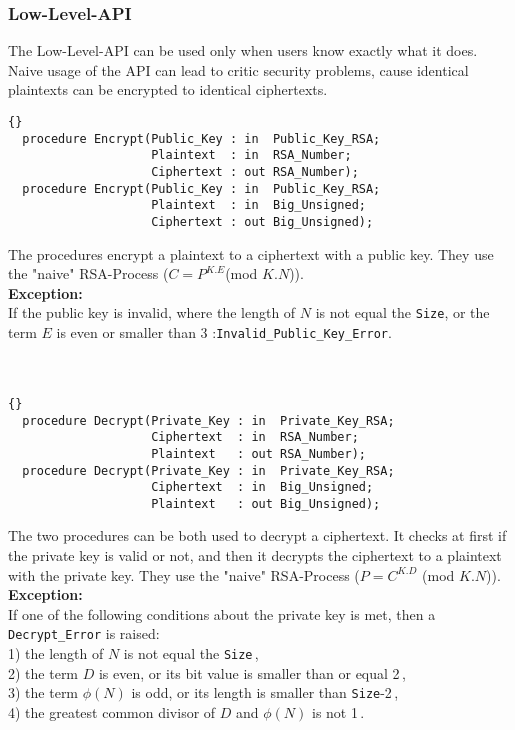 \subsubsection*{Low-Level-API}
The Low-Level-API can be used only when users know exactly what it does. Naive usage of the API can lead to critic security problems, cause identical plaintexts can be encrypted to identical ciphertexts.
\begin{lstlisting}{}
  procedure Encrypt(Public_Key : in  Public_Key_RSA;
                    Plaintext  : in  RSA_Number;
                    Ciphertext : out RSA_Number);   
  procedure Encrypt(Public_Key : in  Public_Key_RSA;
                    Plaintext  : in  Big_Unsigned;
                    Ciphertext : out Big_Unsigned);
\end{lstlisting}
The procedures encrypt a plaintext to a ciphertext with a public key. They use the "naive" RSA-Process ($C=P^{K.E}$(mod $K.N$)).\\
\textbf{Exception:}\\
If the public key is invalid, where the length of $N$ is not equal the \texttt{Size}, or the term $E$ is even or smaller than 3 :\quad \texttt{Invalid\_Public\_Key\_Error}.\\
\hline \\ \ \\
\begin{lstlisting}{}
  procedure Decrypt(Private_Key : in  Private_Key_RSA;
                    Ciphertext  : in  RSA_Number;
                    Plaintext   : out RSA_Number);
  procedure Decrypt(Private_Key : in  Private_Key_RSA;
                    Ciphertext  : in  Big_Unsigned;
                    Plaintext   : out Big_Unsigned);
\end{lstlisting}
The two procedures can be both used to decrypt a ciphertext. It checks at first if the private key is valid or not, and then it decrypts the ciphertext to a plaintext with the private key. They use the "naive" RSA-Process ($P=C^{K.D}$ (mod $K.N$)).\\
\textbf{Exception:}\\ If one of the following conditions about the private key is met, then a \texttt{Decrypt\_Error} is raised:\\
1) the length of $N$ is not equal the \texttt{Size}\,,\\
2) the term $D$ is even, or its bit value is smaller than or equal 2\,, \\
3) the term $\phi(N)$ is odd, or its length is smaller than \texttt{Size}-2\,,\\
4) the greatest common divisor of $D$ and $\phi(N)$ is not 1\,.
